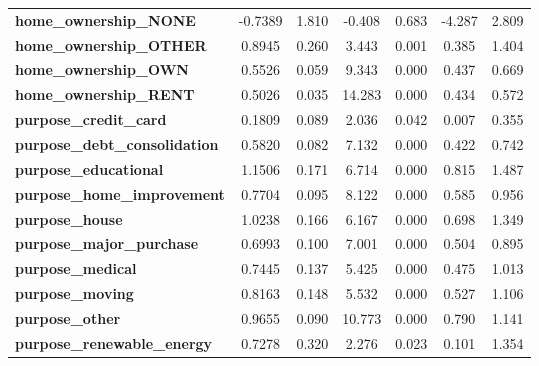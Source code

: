 \begin{center}
\begin{tabular}{lcccccc}
\textbf{home\_ownership\_NONE}                 &      -0.7389  &        1.810     &    -0.408  &         0.683        &       -4.287    &        2.809     \\
\textbf{home\_ownership\_OTHER}                &       0.8945  &        0.260     &     3.443  &         0.001        &        0.385    &        1.404     \\
\textbf{home\_ownership\_OWN}                  &       0.5526  &        0.059     &     9.343  &         0.000        &        0.437    &        0.669     \\
\textbf{home\_ownership\_RENT}                 &       0.5026  &        0.035     &    14.283  &         0.000        &        0.434    &        0.572     \\
\textbf{purpose\_credit\_card}                 &       0.1809  &        0.089     &     2.036  &         0.042        &        0.007    &        0.355     \\
\textbf{purpose\_debt\_consolidation}          &       0.5820  &        0.082     &     7.132  &         0.000        &        0.422    &        0.742     \\
\textbf{purpose\_educational}                  &       1.1506  &        0.171     &     6.714  &         0.000        &        0.815    &        1.487     \\
\textbf{purpose\_home\_improvement}            &       0.7704  &        0.095     &     8.122  &         0.000        &        0.585    &        0.956     \\
\textbf{purpose\_house}                        &       1.0238  &        0.166     &     6.167  &         0.000        &        0.698    &        1.349     \\
\textbf{purpose\_major\_purchase}              &       0.6993  &        0.100     &     7.001  &         0.000        &        0.504    &        0.895     \\
\textbf{purpose\_medical}                      &       0.7445  &        0.137     &     5.425  &         0.000        &        0.475    &        1.013     \\
\textbf{purpose\_moving}                       &       0.8163  &        0.148     &     5.532  &         0.000        &        0.527    &        1.106     \\
\textbf{purpose\_other}                        &       0.9655  &        0.090     &    10.773  &         0.000        &        0.790    &        1.141     \\
\textbf{purpose\_renewable\_energy}            &       0.7278  &        0.320     &     2.276  &         0.023        &        0.101    &        1.354     \\

\end{tabular}
\end{center}
